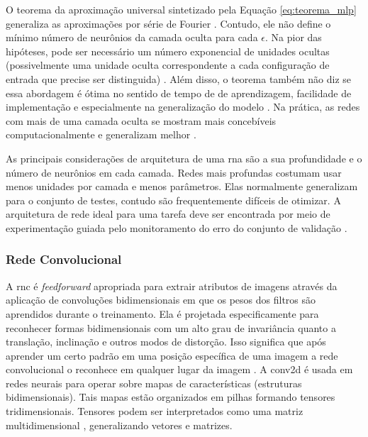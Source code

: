 O teorema da aproximação universal sintetizado pela Equação \ref{eq:teorema_mlp} generaliza as aproximações por série de Fourier \cite{Haykin}. Contudo, ele não define o mínimo número de neurônios  da camada oculta para cada $\epsilon$. Na pior das hipóteses, pode ser necessário um número exponencial de unidades ocultas (possivelmente uma unidade oculta correspondente a cada configuração de entrada que precise ser distinguida) \cite{Goodfellow2016}.
Além disso, o teorema também não diz se essa abordagem é ótima no sentido de tempo de de aprendizagem, facilidade de implementação e especialmente na generalização do modelo \cite{Haykin}. Na prática, as redes com mais de uma camada oculta se mostram mais concebíveis computacionalmente e generalizam melhor \cite{Goodfellow2016}.   

As principais considerações de arquitetura de uma \acrshort{rna} são a sua profundidade e o número de neurônios em cada camada. Redes mais profundas costumam usar  menos unidades por camada e menos parâmetros. Elas normalmente generalizam para o conjunto de testes, contudo são frequentemente difíceis de otimizar. A arquitetura de rede ideal para uma tarefa deve ser encontrada por meio de experimentação guiada pelo monitoramento do erro do conjunto de validação \cite{Goodfellow2016}.


\subsubsection{Rede Convolucional}

A \gls{rnc} é \textit{feedforward} apropriada para extrair atributos de imagens através da aplicação de convoluções bidimensionais em que os pesos dos filtros são aprendidos durante o treinamento. Ela é projetada especificamente para reconhecer formas bidimensionais com um alto grau de invariância quanto a translação, inclinação e outros modos de distorção. Isso significa que após aprender um certo padrão em uma posição específica de uma imagem a rede convolucional o reconhece em qualquer lugar da imagem \cite{Haykin}. 
A \gls{conv2d} é usada  em redes neurais para operar sobre mapas de características (estruturas  bidimensionais). Tais mapas estão organizados em pilhas formando tensores tridimensionais. Tensores podem ser interpretados como uma matriz multidimensional \cite{geron2017hands}, generalizando vetores e matrizes.  

